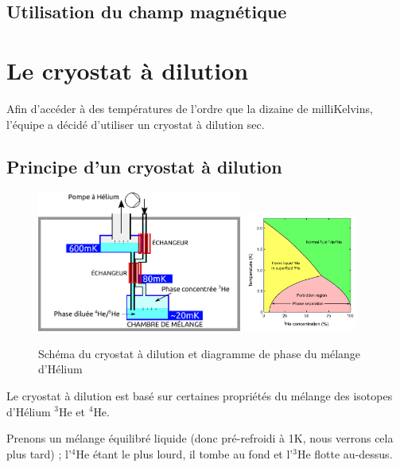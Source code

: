 \documentclass[a4paper,11pt]{report}
\newcommand{\HeT}{$^3$He\xspace}
\newcommand{\HeQ}{$^4$He\xspace}
\begin{document}
\section{Utilisation du champ magnétique}

\chapter{Le cryostat à dilution}
Afin d'accéder à des températures de l'ordre que la dizaine de milliKelvins, l'équipe a décidé d'utiliser un cryostat à dilution sec.
\section{Principe d'un cryostat à dilution}
\begin{figure}[h]
  \begin{center}
    \includegraphics[width=0.6\textwidth]{Images/Cryostat_Schema.pdf}
    \qquad
    \includegraphics[width=0.33\textwidth]{Images/Helium_phase_diagram.pdf}
    \caption{Schéma du cryostat à dilution et diagramme de phase du mélange d'Hélium}
  \end{center}
\end{figure}
Le cryostat à dilution est basé sur certaines propriétés du mélange des isotopes d'Hélium \HeT et \HeQ.
\newline

Prenons un mélange équilibré liquide (donc pré-refroidi à 1K, nous verrons cela plus tard) ; l'\HeQ étant le plus lourd, il tombe au fond et l'\HeT flotte au-dessus.
\end{document}
